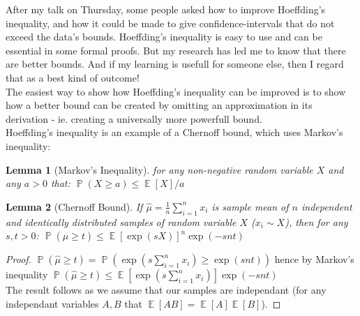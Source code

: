 \documentclass{article}
\newtheorem{lemma}{Lemma}
\DeclareMathOperator{\E}{\mathbb{E}}
\DeclareMathOperator{\p}{\mathbb{P}}
\begin{document}
After my talk on Thursday, some people asked how to improve Hoeffding's inequality, and how it could be made to give confidence-intervals that do not exceed the data's bounds.
Hoeffding's inequality is easy to use and can be essential in some formal proofs. But my research has led me to know that there are better bounds. And if my learning is usefull for someone else, then I regard that as a best kind of outcome!\\

The easiest way to show how Hoeffding's inequality can be improved is to show how a better bound can be created by omitting an approximation in its derivation - ie. creating a universally more powerfull bound.\\
Hoeffding's inequality is an example of a Chernoff bound, which uses Markov's inequality:\\

\begin{lemma}[Markov's Inequality] for any non-negative random variable $X$ and any $a>0$ that: $\p(X\ge a)\le \E[X]/a$ 
\end{lemma}


\begin{lemma}[Chernoff Bound]\label{chernoff1}
If $\hat{\mu} = \frac{1}{n}\sum_{i=1}^nx_i$ is sample mean of $n$ independent and identically distributed samples of random variable $X$ ($x_i\sim X$), then for any $s,t>0$: $\p(\hat{\mu}\ge t)\le\E\left[\exp(sX)\right]^n\exp(-snt)$
\end{lemma}
\begin{proof}
$\p(\hat{\mu}\ge t) =  \p\left(\exp\left(s\sum_{i=1}^nx_i\right)\ge \exp(snt)\right)$ hence by Markov's inequality $\p(\hat{\mu}\ge t)\le \E\left[\exp\left(s\sum_{i=1}^nx_i\right)\right]\exp(-snt)$\\
The result follows as we assume that our samples are independant (for any independant variables $A,B$ that $\E[AB]=\E[A]\E[B]$).
\end{proof}
\end{document}
